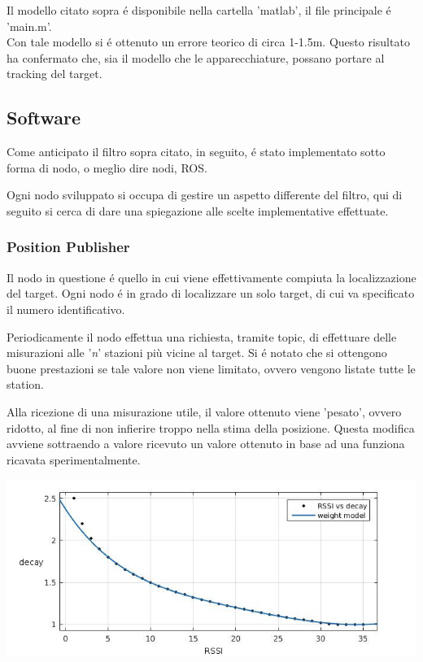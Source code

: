 \documentclass{article}
\begin{document}
Il modello citato sopra \'e disponibile nella cartella 'matlab', il file principale \'e 'main.m'. \\


Con tale modello si \'e ottenuto un errore teorico di circa 1-1.5m. Questo risultato ha confermato che, sia il modello che le apparecchiature, possano portare al tracking del target. 


\subsection{Software}
Come anticipato il filtro sopra citato, in seguito, \'e stato implementato sotto forma di nodo, o meglio dire nodi, ROS.

Ogni nodo sviluppato si occupa di gestire un aspetto differente del filtro, qui di seguito si cerca di dare una spiegazione alle scelte implementative effettuate.




\subsubsection{Position Publisher}
Il nodo in questione \'e quello in cui viene effettivamente compiuta la localizzazione del target. Ogni nodo \'e in grado di localizzare un solo target, di cui va specificato il numero identificativo.

Periodicamente il nodo effettua una richiesta, tramite topic, di effettuare delle misurazioni alle '\textit{n}' stazioni pi\`u vicine al target. Si \'e notato che si ottengono buone prestazioni se tale valore non viene limitato, ovvero vengono listate tutte le station.

Alla ricezione di una misurazione utile, il valore ottenuto viene 'pesato', ovvero ridotto, al fine di non infierire troppo nella stima della posizione. 
Questa modifica avviene sottraendo a valore ricevuto un valore ottenuto in base ad una funziona ricavata sperimentalmente.

\begin{center}
	\includegraphics[scale=0.4]{manual_imgs/weight_model}
\end{center}
\end{document}
